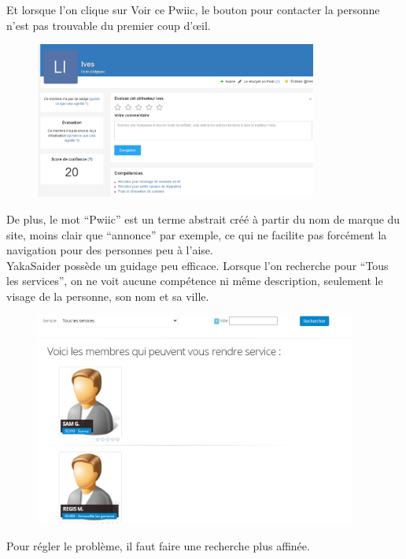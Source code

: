 \documentclass[a4paper,11pt]{article}
\begin{document}
Et lorsque l’on clique sur Voir ce Pwiic, le bouton pour contacter la personne n’est pas trouvable du premier coup d’œil.\\

\begin{figure}[H]
  \includegraphics[width=350px]{images/voir-ce-pwiic.png}
  \label{fig:voir-ce-pwiic}
\end{figure}

De plus, le mot “Pwiic” est un terme abstrait créé à partir du nom de marque du site, moins clair que “annonce”
par exemple, ce qui ne facilite pas forcément la navigation pour des personnes peu à l’aise.\\

YakaSaider possède un guidage peu efficace. Lorsque l’on recherche pour “Tous les services”, on ne voit aucune
compétence ni même description, seulement le visage de la personne, son nom et sa ville.\\

\begin{figure}[H]
  \includegraphics[width=400px]{images/guidage-yakasaider.png}
  \label{fig:guidage-yakasaider}
\end{figure}

Pour régler le problème, il faut faire une recherche plus affinée.\\
\end{document}
